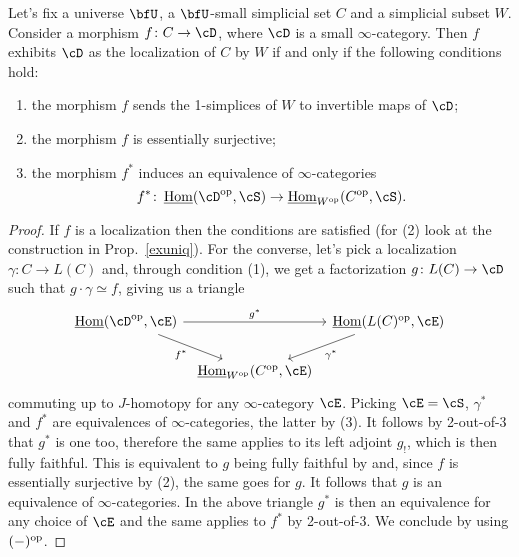 \begin{prop}

  Let's fix a universe $\bfU$, a $\bfU$-small simplicial set $C$ and a
  simplicial subset $W$. Consider a morphism $f\colon C\rightarrow\cD$,
  where $\cD$ is a small $\infty$-category. Then $f$ exhibits $\cD$ as the
  localization of $C$ by $W$ if and only if the following conditions hold:
  \begin{enumerate}
    \item the morphism $f$ sends the 1-simplices of $W$ to invertible maps of
      $\cD$;
    \item the morphism $f$ is essentially surjective;
    \item the morphism $f^*$ induces an equivalence of $\infty$-categories
      \[f^*\colon\home(\cD^{\op},\cS)\rightarrow\home_{W^{\op}}(C^{\op},\cS).\]
  \end{enumerate}
\end{prop}
\begin{proof}
  If $f$ is a localization then the conditions are satisfied (for (2) look at
  the construction in Prop.\ \ref{exuniq}).
  For the converse, let's pick a localization $\gamma\colon C\rightarrow
  L(C)$ and, through condition (1), we get a factorization $g\colon
  L(C)\rightarrow\cD$ such that $g\cdot\gamma\simeq f$, giving us a triangle
  \[\begin{tikzcd}[column sep=tiny]
    {\home(\cD^{\op},\cE)} && {\home(L(C)^{\op},\cE)} \\
                           & {\home_{W^{\op}}(C^{\op},\cE)}
    \arrow["{g^*}", from=1-1, to=1-3]
    \arrow["{f^*}"', from=1-1, to=2-2]
    \arrow["{\gamma^*}", from=1-3, to=2-2]
  \end{tikzcd}\]
  commuting up to $J$-homotopy for any $\infty$-category $\cE$. Picking
  $\cE=\cS$, $\gamma^*$ and $f^*$ are equivalences
  of $\infty$-categories, the latter by (3). It follows by 2-out-of-3 that $g^*$
  is one too, therefore the same applies to its left adjoint $g_!$, which is
  then fully faithful. This is equivalent to $g$ being fully
  faithful by \cite[Prop.\ 6.1.15]{Cis19} and, since
  $f$ is essentially surjective by (2), the same goes for $g$. It follows that
  $g$ is an equivalence of $\infty$-categories. In the above triangle $g^*$ is
  then an equivalence for any choice of $\cE$ and the same applies to $f^*$ by
  2-out-of-3. We conclude by using $(-)^{\operatorname{op}}$.
\end{proof}

